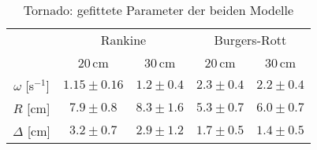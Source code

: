 \documentclass[12pt,a4paper,headinclude,bibtotoc]{scrartcl}
\begin{document}
 \begin{table}[!htb]
 	\centering
 	\begin{tabular}{|c||c|c||c|c|}
 	\hline
 	& \multicolumn{2}{c||}{Rankine} & \multicolumn{2}{c|}{Burgers-Rott}\\
 	& $20\,$cm & $30\,$cm & $20\,$cm & $30\,$cm\\
 	\hline
 	$\omega$ [s$^{-1}$]& $1.15 \pm 0.16$ & $1.2 \pm 0.4$ & $2.3 \pm 0.4$ & $2.2 \pm 0.4$ \\
 	$R$ [cm]               & $7.9 \pm 0.8$ & $8.3 \pm 1.6$ & $5.3 \pm 0.7$ & $6.0 \pm 0.7 $ \\
 	$\Delta$ [cm]         & $3.2 \pm 0.7$ & $2.9 \pm 1.2$ & $1.7  \pm 0.5$ & $ 1.4 \pm 0.5$ \\
 	\hline
 	\end{tabular}
 	\caption{Tornado: gefittete Parameter der beiden Modelle}
 	\label{tab:tornado}
 \end{table}
\end{document}
